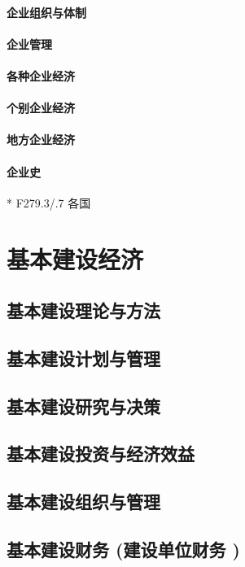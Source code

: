 \documentclass[UTF8]{../../RepresentationUniverse}
\begin{document}
\subsubsection{企业组织与体制}
\subsubsection{企业管理}
\subsubsection{各种企业经济}
\subsubsection{个别企业经济}
\subsubsection{地方企业经济}
\subsubsection{企业史}
      * F279.3/.7 各国






\chapter{基本建设经济}
    \section{基本建设理论与方法}
    \section{基本建设计划与管理}
    \section{基本建设研究与决策}
    \section{基本建设投资与经济效益}
    \section{基本建设组织与管理}
    \section{基本建设财务 (建设单位财务 )}
\end{document}
